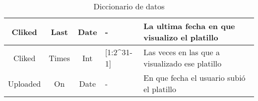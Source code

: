 \begin{landscape}
\begin{table}
\begin{center}
\begin{tabular}{| c | c | c | p{3cm} | p{12cm}|}
        \midrule
        Cliked & Last  & Date & -  & La ultima fecha en que visualizo el platillo \\
        \midrule
        Cliked & Times  & Int & [1:2\^{ }31-1]  & Las veces en las que a visualizado ese platillo \\
        \midrule
        Uploaded & On  & Date & - & En que fecha el usuario subió el platillo \\
        \bottomrule
      \end{tabular}
      \caption{Diccionario de datos}
      \label{Diccionario de datos}
    \end{center}
  \end{table}
\end{landscape}  
  